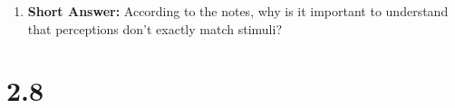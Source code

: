 \begin{enumerate}[label=\textbf{Q2.7.\arabic*}]
      \item \textbf{Short Answer:} According to the notes, why is it important to understand that perceptions don't exactly match stimuli? \\
\end{enumerate}

\squigglyline


\section*{2.8}

